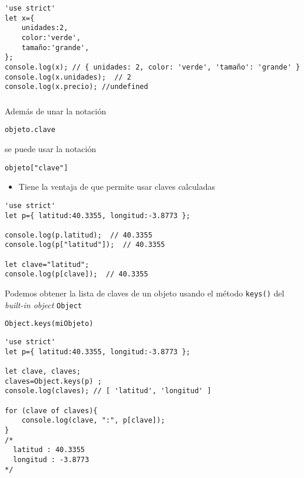 \documentclass[ucs]{beamer}
\begin{document}
\begin{frame}[fragile]
\frametitle{}

  \begin{scriptsize}
  \begin{verbatim}
'use strict'
let x={
    unidades:2,
    color:'verde',
    tamaño:'grande',
};
console.log(x); // { unidades: 2, color: 'verde', 'tamaño': 'grande' }
console.log(x.unidades);  // 2
console.log(x.precio); //undefined
  \end{verbatim}
  \end{scriptsize}
\end{frame}




\begin{frame}[fragile]
\frametitle{}
Además de unar la notación 

\verb|objeto.clave|

se puede usar la notación

\verb|objeto["clave"]|

\begin{itemize}
\item
Tiene la ventaja de que permite usar claves calculadas
\end{itemize}


  \begin{scriptsize}
  \begin{verbatim}
'use strict'
let p={ latitud:40.3355, longitud:-3.8773 };

console.log(p.latitud);  // 40.3355
console.log(p["latitud"]);  // 40.3355

let clave="latitud";
console.log(p[clave]);  // 40.3355
  \end{verbatim}
  \end{scriptsize}

\end{frame}

\begin{frame}[fragile]

Podemos obtener la lista de claves de un objeto usando
el método 
\verb|keys()|
del \emph{built-in object} \verb|Object| 

\verb|Object.keys(miObjeto)|

  \begin{scriptsize}
  \begin{verbatim}
'use strict'
let p={ latitud:40.3355, longitud:-3.8773 };

let clave, claves;
claves=Object.keys(p) ;
console.log(claves); // [ 'latitud', 'longitud' ]

for (clave of claves){
    console.log(clave, ":", p[clave]);
}
/* 
  latitud : 40.3355
  longitud : -3.8773
*/
  \end{verbatim}
  \end{scriptsize}

\end{frame}
\end{document}
